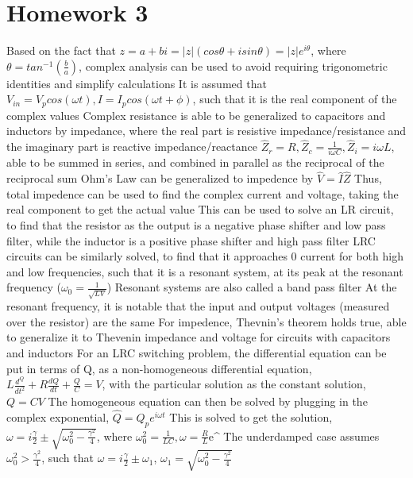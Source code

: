\documentclass[11 pt, twoside]{article}
\newenvironment{outline*}
{
	\begin{outline}[enumerate]
	}
	{\end{outline}
}
\begin{document}
\section{Homework 3}
\begin{outline*}
\1 Based on the fact that $z = a + bi = |z|(cos\theta + isin\theta) = |z|e^{i\theta}$, where $\theta = tan^{-1} (\frac{b}{a})$, complex analysis can be used to avoid requiring trigonometric identities and simplify calculations
	\2 It is assumed that $V_{in} = V_pcos(\omega t), I = I_p cos(\omega t + \phi)$, such that it is the real component of the complex values
	\2 Complex resistance is able to be generalized to capacitors and inductors by impedance, where the real part is resistive impedance/resistance and the imaginary part is reactive impedance/reactance
		\3 $\hat{Z}_r = R, \hat{Z}_c = \frac{1}{i\omega C}, \hat{Z}_i = i\omega L$, able to be summed in series, and combined in parallel as the reciprocal of the reciprocal sum
		\3 Ohm's Law can be generalized to impedence by $\hat{V} = \hat{I}\hat{Z}$
	\2 Thus, total impedence can be used to find the complex current and voltage, taking the real component to get the actual value
	\2 This can be used to solve an LR circuit, to find that the resistor as the output is a negative phase shifter and low pass filter, while the inductor is a positive phase shifter and high pass filter
		\3 LRC circuits can be similarly solved, to find that it approaches 0 current for both high and low frequencies, such that it is a resonant system, at its peak at the resonant frequency ($\omega_0 = \frac{1}{\sqrt{LV}}$)	
			\4 Resonant systems are also called a band pass filter
			\4 At the resonant frequency, it is notable that the input and output voltages (measured over the resistor) are the same
	\2 For impedence, Thevnin's theorem holds true, able to generalize it to Thevenin impedance and voltage for circuits with capacitors and inductors
\1 For an LRC switching problem, the differential equation can be put in terms of Q, as a non-homogeneous differential equation, $L\frac{d^Q}{dt^2} + R\frac{dQ}{dt} + \frac{Q}{C} = V$, with the particular solution as the constant solution, $Q = CV$
	\2 The homogeneous equation can then be solved by plugging in the complex exponential, $\hat{Q} = Q_pe^{i\omega t}$
		\3 This is solved to get the solution, $\omega = i\frac{\gamma}{2} \pm \sqrt{\omega_0^2 - \frac{\gamma^2}{4}}$, where $\omega_0^2 = \frac{1}{LC}, \omega = \frac{R}{L}$e^
	\2 The underdamped case assumes $\omega_0^2 > \frac{\gamma^2}{4}$, such that $\omega = i\frac{\gamma}{2} \pm \omega_1$, $\omega_1 = \sqrt{\omega_0^2 - \frac{\gamma^2}{4}}$

\end{outline*}
\end{document}
